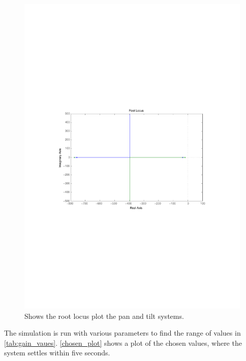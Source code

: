 \begin{figure}[htb]
	\begin{center}
	\includegraphics[width=\textwidth,trim=0 0 0 0]{graphics/rlocus_plot.pdf} %
	\caption{Shows the root locus plot the pan and tilt systems.}
	\label{fig:rlocus_plot}			%
	\end{center}
\end{figure}

The simulation is run with various parameters to find the range of values in \ref{tab:gain_vaues}. \ref{chosen_plot} shows a plot of the chosen values, where the system settles within five seconds.

